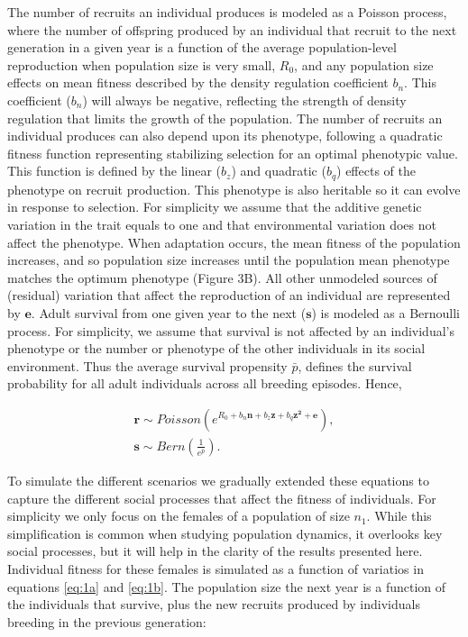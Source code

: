 \documentclass{article}
\begin{document}
The number of recruits an individual produces is modeled as a Poisson process, where the number of offspring produced by an individual that recruit to the next generation in a given year is a function of the average population-level reproduction when population size is very small, $R_0$, and any population size effects on mean fitness described by the density regulation coefficient $b_{n}$. This coefficient ($b_{n}$) will always be negative, reflecting the strength of density regulation that limits the growth of the population.  The number of recruits an individual produces can also depend upon its phenotype, following a quadratic fitness function representing stabilizing selection for an optimal phenotypic value. This function is defined by the linear ($b_z$) and quadratic ($b_q$) effects of the phenotype on recruit production. This phenotype is also heritable so it can evolve in response to selection. For simplicity we assume that the additive genetic variation in the trait equals to one and that environmental variation does not affect the phenotype. When adaptation occurs, the mean fitness of the population increases, and so population size increases until the population mean phenotype matches the optimum phenotype (Figure 3B). All other unmodeled sources of (residual) variation that affect the reproduction of an individual are represented by $\mathbf{e}$. Adult survival from one given year to the next ($\mathbf{s}$) is modeled as a Bernoulli process. For simplicity, we assume that survival is not affected by an individual's phenotype or the number or phenotype of the other individuals in its social environment. Thus the average survival propensity $\bar{p}$, defines the survival probability for all adult individuals across all breeding episodes. Hence,

\begin{subequations} 
\begin{gather}
\mathbf{r}\sim Poisson(e^{R_{0} + b_{n} \mathbf{n} + b_{z} \mathbf{z} + b_{q} \mathbf{z^2} + \mathbf{e}}), \label{eq:1a} \\
\mathbf{s}\sim Bern(\frac{1}{e^{\bar{p}}}). \label{eq:1b}
\end{gather}
\end{subequations}

To simulate the different scenarios we gradually extended these equations to capture the different social processes that affect the fitness of individuals. For simplicity we only focus on the females of a population of size $n_{1}$. While this simplification is common when studying population dynamics, it overlooks key social processes, but it will help in the clarity of the results presented here. Individual fitness for these females is simulated as a function of variatios in equations \ref{eq:1a} and \ref{eq:1b}. The population size the next year is a function of the individuals that survive, plus the new recruits produced by individuals breeding in the previous generation:
\end{document}
